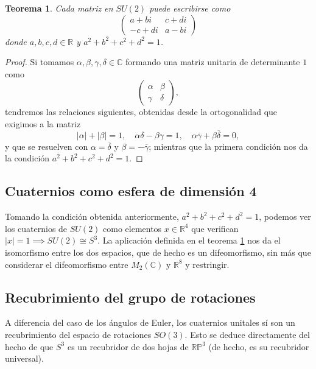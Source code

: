 \documentclass{article}
\theoremstyle{plain}
\newtheorem{theorem}{Teorema}
\theoremstyle{definition}
\theoremstyle{remark}
\begin{document}
\begin{theorem}
\label{su2}
  Cada matriz en $SU(2)$ puede escribirse como
  \[\begin{pmatrix}
      a+bi & c+di \\
      -c+di & a-bi
    \end{pmatrix}\]
  donde $a,b,c,d \in \mathbb{R}$ y $a^2+b^2+c^2+d^2 = 1$.
\end{theorem}
\begin{proof}
  Si tomamos $\alpha,\beta,\gamma,\delta \in \mathbb{C}$ formando una matriz unitaria de
  determinante $1$ como
    \[\begin{pmatrix}
      \alpha & \beta \\
      \gamma & \delta
    \end{pmatrix},\]
  tendremos las relaciones siguientes, obtenidas desde la ortogonalidad que exigimos a la matriz
  \[|\alpha|+|\beta| = 1,
    \quad
    \alpha\delta-\beta\gamma = 1,
    \quad
    \alpha\overline{\gamma} + \beta\overline{\delta} = 0,
  \]
  y que se resuelven con $\alpha = \overline{\delta}$ y
  $\beta = -\overline{\gamma}$; mientras que la primera condición
  nos da la condición $a^2+b^2+c^2+d^2 = 1$.
\end{proof}


\subsection{Cuaternios como esfera de dimensión 4}

Tomando la condición obtenida anteriormente, $a^2+b^2+c^2+d^2 = 1$,
podemos ver los cuaternios de $SU(2)$ como elementos
$x \in \mathbb R^4$ que verifican
$\left|x\right| = 1 \implies SU(2) \cong S^3$. La aplicación definida
en el teorema \ref{su2} nos da el isomorfismo entre los dos espacios,
que de hecho es un difeomorfismo, sin más que considerar el
difeomorfismo entre $M_2(\mathbb C)$ y $\mathbb R^8$ y restringir.


\subsection{Recubrimiento del grupo de rotaciones}

A diferencia del caso de los ángulos de Euler, los cuaternios unitales
sí son un recubrimiento del espacio de rotaciones $SO(3)$. Esto se
deduce directamente del hecho de que $S^3$ es un recubridor de dos
hojas de $\mathbb{RP}^3$ (de hecho, es su recubridor universal).
\end{document}
